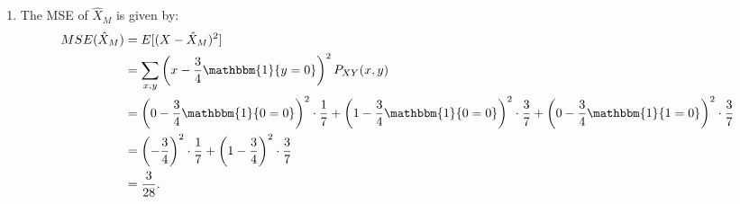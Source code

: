 \begin{problem}{11}
\begin{enumerate}
\item The MSE of $\hat X_M$ is given by:
\begin{align*}
MSE(\hat X_M) &= E[(X-\hat X_M)^2] \\
& = \sum_{x, y} \left ( x-\frac{3}{4} \mathbbm{1} \{ y=0\}\right)^2P_{XY}(x, y) \\
& = \left (0-\frac{3}{4} \mathbbm{1} \{ 0=0\} \right)^2 \cdot \frac{1}{7}+\left (1-\frac{3}{4} \mathbbm{1} \{ 0=0\} \right)^2 \cdot \frac{3}{7}+\left (0-\frac{3}{4} \mathbbm{1} \{ 1=0\} \right)^2 \cdot \frac{3}{7} \\
& = \left (-\frac{3}{4} \right)^2 \cdot \frac{1}{7}+\left (1-\frac{3}{4}\right)^2 \cdot \frac{3}{7} \\
& = \frac{3}{28}.
\end{align*}

\end{enumerate}
\end{problem}

